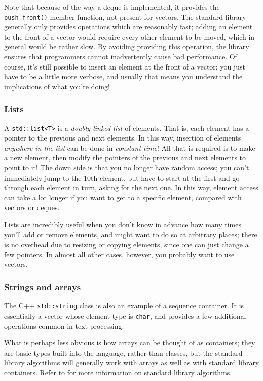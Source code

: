 \documentclass[a4paper]{scrartcl}
\begin{document}
Note that because of the way a deque is implemented, it provides the \verb|push_front()| member function, not present for vectors. The standard library generally only provides operations which are reasonably fast; adding an element to the front of a vector would require every other element to be moved, which in general would be rather slow. By avoiding providing this operation, the library ensures that programmers cannot inadvertently cause bad performance. Of course, it's still possible to insert an element at the front of a vector; you just have to be a little more verbose, and usually that means you understand the implications of what you're doing!

\subsubsection{Lists}\label{sec:containers_sequence_list}
A \verb|std::list<T>| is a \emph{doubly-linked list} of elements. That is, each element has a pointer to the previous and next elements. In this way, insertion of elements \emph{anywhere in the list} can be done in \emph{constant time}! All that is required is to make a new element, then modify the pointers of the previous and next elements to point to it! The down side is that you no longer have random access; you can't immediately jump to the 10th element, but have to start at the first and go through each element in turn, asking for the next one. In this way, element access can take a lot longer if you want to get to a specific element, compared with vectors or deques.

Lists are incredibly useful when you don't know in advance how many times you'll add or remove elements, and might want to do so at arbitrary places; there is no overhead due to resizing or copying elements, since one can just change a few pointers. In almost all other cases, however, you probably want to use vectors.

\subsubsection{Strings and arrays}\label{sec:containers_sequence_strings_arrays}
The C++ \verb|std::string| class is also an example of a sequence container. It is essentially a vector whose element type is \verb|char|, and provides a few additional operations common in text processing.

What is perhaps less obvious is how arrays can be thought of as containers; they are basic types built into the language, rather than classes, but the standard library algorithms will generally work with arrays as well as with standard library containers. Refer to\cite{StandardLibrary} for more information on standard library algorithms.
\end{document}

